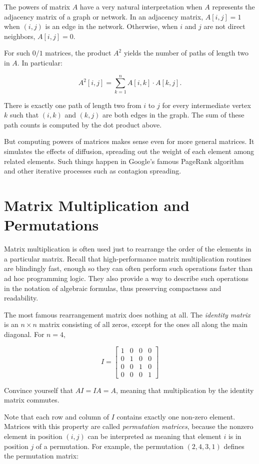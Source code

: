 \documentclass[10pt]{article}
\begin{document}
The powers of matrix \(A\) have a very natural interpretation when \(A\) represents the adjacency matrix of a graph or network. In an adjacency matrix, \(A[i, j] = 1\) when \((i, j)\) is an edge in the network. Otherwise, when \(i\) and \(j\) are not direct neighbors, \(A[i, j] = 0\).

For such \(0 / 1\) matrices, the product \(A^{2}\) yields the number of paths of length two in \(A\). In particular:

\[
A^{2}[i, j] = \sum_{k=1}^{n} A[i, k] \cdot A[k, j].
\]

There is exactly one path of length two from \(i\) to \(j\) for every intermediate vertex \(k\) such that \((i, k)\) and \((k, j)\) are both edges in the graph. The sum of these path counts is computed by the dot product above.

But computing powers of matrices makes sense even for more general matrices. It simulates the effects of diffusion, spreading out the weight of each element among related elements. Such things happen in Google's famous PageRank algorithm and other iterative processes such as contagion spreading.

\section*{Matrix Multiplication and Permutations}
Matrix multiplication is often used just to rearrange the order of the elements in a particular matrix. Recall that high-performance matrix multiplication routines are blindingly fast, enough so they can often perform such operations faster than ad hoc programming logic. They also provide a way to describe such operations in the notation of algebraic formulas, thus preserving compactness and readability.

The most famous rearrangement matrix does nothing at all. The \textit{identity matrix} is an \(n \times n\) matrix consisting of all zeros, except for the ones all along the main diagonal. For \(n=4\),

\[
I = \begin{bmatrix}
1 & 0 & 0 & 0 \\
0 & 1 & 0 & 0 \\
0 & 0 & 1 & 0 \\
0 & 0 & 0 & 1
\end{bmatrix}
\]

Convince yourself that \(AI=IA=A\), meaning that multiplication by the identity matrix commutes.

Note that each row and column of \(I\) contains exactly one non-zero element. Matrices with this property are called \textit{permutation matrices}, because the nonzero element in position \((i, j)\) can be interpreted as meaning that element \(i\) is in position \(j\) of a permutation. For example, the permutation \((2,4,3,1)\) defines the permutation matrix:
\end{document}
